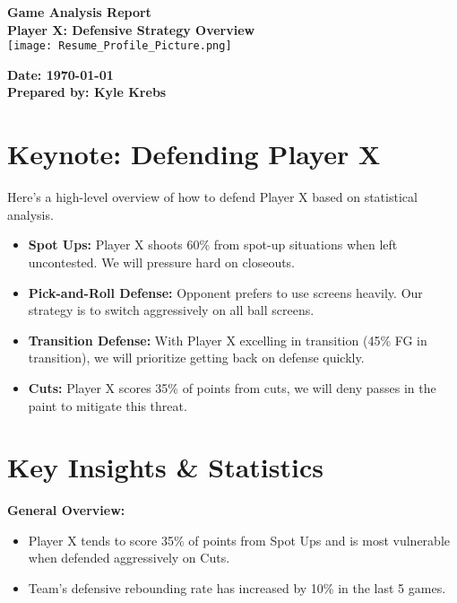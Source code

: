 \documentclass[a4paper,12pt]{article}
\begin{document}
\begin{titlepage}
    \centering
    {\Huge \textbf{Game Analysis Report}}\\[1.5cm]
    
    {\Large \textbf{Player X: Defensive Strategy Overview}}\\[2cm]
    
    \texttt{[image: Resume\_Profile\_Picture.png]} %
    
    \vfill
    
    \textbf{Date: \today}\\[1cm]
    \textbf{Prepared by: Kyle Krebs}
\end{titlepage}


\section*{Keynote: Defending Player X}
Here’s a high-level overview of how to defend Player X based on statistical analysis. 

\begin{itemize}
    \item \textbf{Spot Ups:} Player X shoots 60\% from spot-up situations when left uncontested. We will pressure hard on closeouts.
    \item \textbf{Pick-and-Roll Defense:} Opponent prefers to use screens heavily. Our strategy is to switch aggressively on all ball screens.
    \item \textbf{Transition Defense:} With Player X excelling in transition (45\% FG in transition), we will prioritize getting back on defense quickly.
    \item \textbf{Cuts:} Player X scores 35\% of points from cuts, we will deny passes in the paint to mitigate this threat.
\end{itemize}

\section*{Key Insights \& Statistics}

\textbf{General Overview:}
\begin{itemize}
    \item Player X tends to score 35\% of points from Spot Ups and is most vulnerable when defended aggressively on Cuts.
    \item Team's defensive rebounding rate has increased by 10\% in the last 5 games.
\end{itemize}
\end{document}
